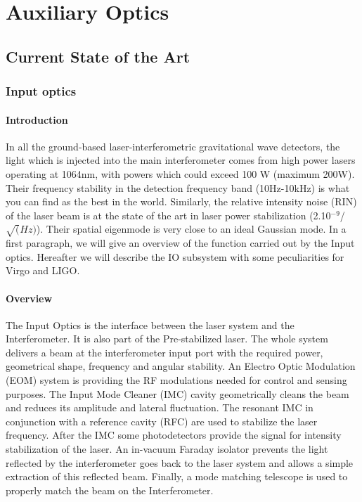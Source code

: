 \section{Auxiliary Optics}
\subsection{Current State of the Art}
\subsubsection{Input optics}
\paragraph{Introduction}
In all the ground-based laser-interferometric gravitational wave detectors, the light which is injected into the main interferometer comes from high power lasers operating at 1064nm, with powers which could exceed 100 W (maximum 200W). Their frequency stability in the detection frequency band (10Hz-10kHz) is what you can find as the best in the world. Similarly, the relative intensity noise (RIN) of the laser beam is at the state of the art in laser power stabilization (2.10$^{-9}$/$\sqrt(Hz)$). Their spatial eigenmode is very close to an ideal Gaussian mode. In a first paragraph, we will give an overview of the function carried out by the Input optics. Hereafter we will describe the IO subsystem with some peculiarities for Virgo and LIGO.

\paragraph {Overview}

The Input Optics is the interface between the laser system and the Interferometer. It is also part of the Pre-stabilized laser. The whole system delivers a beam at the interferometer input port with the required power, geometrical shape, frequency and angular stability. An Electro Optic Modulation (EOM) system is providing the RF modulations needed for control and sensing purposes. The Input Mode Cleaner (IMC) cavity geometrically cleans the beam and reduces its amplitude and lateral fluctuation. The resonant IMC in conjunction with a reference cavity (RFC) are used to stabilize the laser frequency.
After the IMC some photodetectors provide the signal for intensity stabilization of the laser. An in-vacuum Faraday isolator prevents the light reflected by the interferometer goes back to the laser system and allows a simple extraction of this reflected beam. Finally, a mode matching telescope is used to properly match the beam on the Interferometer.

